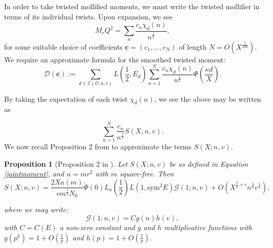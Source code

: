 \documentclass[12pt]{amsart}
\numberwithin{equation}{section}
\newtheorem{prop}[thm]{Proposition}
\numberwithin{thm}{section}
\newcommand{\1}{\mathbf 1}
\begin{document}
In order to take twisted mollified moments, we must write the twisted mollifier in terms of its individual twists. Upon expansion, we see \begin{equation}
	M_rQ^2=\sum_n \frac{c_n \chi_d(n)}{n^{\frac{1}{2}}},
\end{equation} for some suitable choice of coefficients $\mathbf{c}=(c_1,\dots,c_N)$ of length $N=O(X^{\frac{1}{100}}).$ We require an approximate formula for the smoothed twisted moment:
\begin{equation}\label{deftwist}
	\mathscr{D}(\mathbf{c}):=\sum_{d\in\mathcal{E}(\mathscr{O},a,v)} L\left(\frac{1}{2}, E_d\right) \sum^N_{n=1}\frac{c_n \chi_d(n)}{n^{\frac{1}{2}}}\Phi\left(\frac{\kappa d}{X}\right).
\end{equation}

By taking the expectation of each twist $\chi_d(n)$, we see the above may be written as
	
	\begin{equation}\label{twist+prop2}
\sum^N_{n=1}\frac{c_{n}}{n^{\frac{1}{2}}} S(X;n,v) .
	\end{equation}
	We now recall Proposition 2 from \cite{RS2} to approximate the terms $S(X;n,v).$
	\begin{prop}[Proposition 2 in \cite{RS2}]\label{1twist}
		Let $S(X;n,v)$ be as defined in Equation \eqref{jointmoment}, and $n=mr^2$ with $m$ square-free. Then 
		\begin{equation}
			S(X;n,v)=
		 \frac{2Xa\left(m\right)}{v m^{\frac{1}{2}}N_0}\check{\Phi}(0)L_a\left(\frac{1}{2}\right)L(1, \text{sym}^2E)\mathcal{G}(1;n,v)+O(X^{\frac{7}{8}+\epsilon}n^{\frac{3}{8}}v^{\frac{1}{4}}),
			\end{equation}
			
			where we may write: \begin{equation}\label{defG}
			\mathcal{G}(1;n,v)=Cg(n)h(v),
			\end{equation}
			with $C=C(E)$ a non-zero constant and $g$ and $h$ multiplicative functions with $g(p^k)=1+O\left(\frac{1}{p}\right)$ and $h(p)=1+O\left(\frac{1}{p}\right).$
		
	\end{prop}
\end{document}
